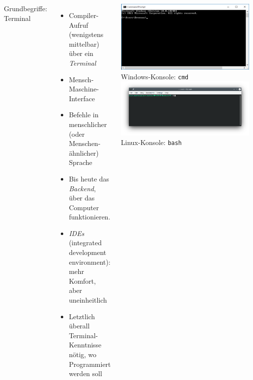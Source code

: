
\begin{frame}
%
\begin{columns}[T]
\begin{Large}
{Grundbegriffe: Terminal}
\end{Large}
\begin{itemize}
\item Compiler-Aufruf (wenigstens mittelbar) über ein \emph{Terminal}
\item Mensch-Maschine-Interface
\item Befehle in menschlicher (oder Menschen-ähnlicher) Sprache
\item Bis heute das \emph{Backend}, über das Computer funktionieren.
\item \emph{IDEs} (integrated development environment): mehr Komfort, aber uneinheitlich
\item Letztlich überall Terminal-Kenntnisse nötig, wo Programmiert werden soll
\end{itemize}
%
\includegraphics[width=\linewidth]{./gfx/cmd}
{\tiny Windows-Konsole: \texttt{cmd}}
\includegraphics[width=\linewidth]{./gfx/bash}
{\tiny Linux-Konsole: \texttt{bash}}
\end{columns}
%
\end{frame}

